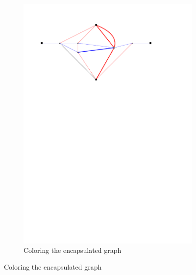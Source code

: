 \documentclass[a4paper]{article}
\theoremstyle{definition}
\begin{document}
\begin{figure}[h]
\begin{subfigure}[b]{\textwidth}
        \includegraphics[width=\textwidth]{img/problemGraph2}
        \caption{Coloring the encapsulated graph}
    \end{subfigure}
    

\end{figure}
\end{document}
